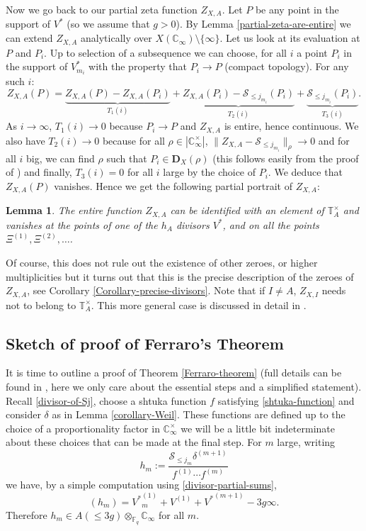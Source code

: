 \documentclass[11pt]{amsart}
\numberwithin{equation}{section}
\newcommand{\FF}{\mathbb{F}}
\newcommand{\CC}{\mathbb{C}}
\newcommand{\TT}{\mathbb{T}}
\newtheorem{Lemma}[Theorem]{Lemma}
\begin{document}
Now we go back to our partial zeta function
$Z_{X,A}$. Let $P$ be any point in the support of $V^*$ (so we assume that $g>0$). By Lemma \ref{partial-zeta-are-entire} we can extend $Z_{X,A}$ analytically over $X(\CC_\infty)\setminus\{\infty\}$. Let us look at its evaluation at $P$ and $P_i$. Up to selection of a subsequence we can choose, 
for all $i$ a point $P_i$ in the support of $V^*_{m_i}$ with the property that $P_i\rightarrow P$ (compact topology).
For any such $i$:
$$Z_{X,A}(P)=\underbrace{Z_{X,A}(P)-Z_{X,A}(P_i)}_{T_1(i)}+\underbrace{Z_{X,A}(P_i)-\mathcal{S}_{\leq j_{m_i}}(P_{i})}_{T_2(i)}+\underbrace{\mathcal{S}_{\leq j_{m_i}}(P_{i})}_{T_3(i)}.$$ As $i\rightarrow\infty$, $T_1(i)\rightarrow0$ because $P_i\rightarrow P$ and $Z_{X,A}$ is entire, hence continuous. We also have $T_2(i)\rightarrow0$ because for all $\rho\in|\CC_\infty^\times|$,
$\|Z_{X,A}-\mathcal{S}_{\leq j_{m_i}}\|_\rho\rightarrow0$ and for all $i$ big, we can find $\rho$ such that $P_i\in\boldsymbol{D}_X(\rho)$ (this follows easily from the proof of \cite[Lemma 1.1]{CHU&NGO&PEL})
and finally, $T_3(i)=0$ for all $i$ large by the choice of $P_i$. We deduce that $Z_{X,A}(P)$ vanishes. Hence we get the following partial portrait of $Z_{X,A}$:

\begin{Lemma}
The entire function $Z_{X,A}$ can be identified with an element of $\TT_A^\times$ and vanishes at the points of one of the $h_A$ divisors $V^*$, and on all the points 
$\Xi^{(1)},\Xi^{(2)},\ldots$.
\end{Lemma}

Of course, this does not rule out the existence of other zeroes, or higher multiplicities but it turns out that this is the precise description of the zeroes of $Z_{X,A}$, see Corollary \ref{Corollary-precise-divisors}. Note that if $I\neq A$, $Z_{X,I}$ needs not to belong to $\TT_A^\times$. This more general case is discussed in detail in \cite{FER1}.

\subsection{Sketch of proof of Ferraro's Theorem} It is time to outline a proof of Theorem \ref{Ferraro-theorem} (full details can be found in \cite{FER1}, here we only care about the essential steps and a simplified statement). Recall \eqref{divisor-of-Sj}, choose a shtuka function $f$ satisfying \eqref{shtuka-function} and consider $\delta$ as in Lemma \ref{corollary-Weil}. These functions are defined up to the choice of a proportionality factor in $\CC_\infty^\times$ we will be a little bit indeterminate about these choices that can be made at the final step.
For $m$ large, writing $$h_m:=\frac{\mathcal{S}_{\leq j_{m}}\delta^{(m+1)}}{f^{(1)}\cdots f^{(m)}}$$ we have, by a simple computation using \eqref{divisor-partial-sums},
\begin{equation}
(h_m)={V^*}^{(1)}_m+V^{(1)}+{V^*}^{(m+1)}-3g\infty.
\end{equation}
Therefore $h_m\in A(\leq 3g)\otimes_{\FF_q}\CC_\infty$ for all $m$. 
\end{document}
